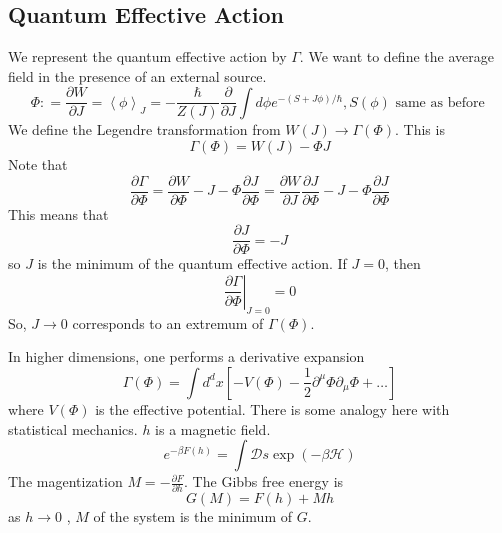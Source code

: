 \documentclass[11pt, oneside]{article}   	%
\theoremstyle{slanted}
\begin{document}
\subsection{Quantum Effective Action}
We represent the quantum effective action by $ \Gamma $. 
We want to define the 
average field in the 
presence of an external source. 
\[
\Phi  : = \frac{\partial  W }{\partial  J } =  \left< \phi  \right> _ J 	=  - \frac{ \hbar }{ Z \left( J  \right) }
\frac{\partial  }{\partial  J } \int d \phi e ^{  - \left(  S + J \phi  \right)   / \hbar } , S \left( 
\phi \right)  \text{ same as before }
\] We define the Legendre transformation from $ W \left( J  \right)  
\to \Gamma \left( \Phi  \right)  $.
This is 
\[
\Gamma ( \Phi ) = W \left(  J  \right)   - \Phi J 
\]  Note that 
\[
\frac{\partial  \Gamma }{\partial  \Phi }   = 
\frac{\partial  W }{\partial  \Phi }   - J -  \Phi \frac{\partial  J }{\partial  
\Phi }   = \frac{\partial W }{\partial  J }  \frac{\partial  J }{\partial  \Phi }  
- J  -\Phi \frac{\partial  J }{\partial  \Phi } 
\] This means 
that 
\[
\frac{\partial  J }{\partial  \Phi }   = - J 
\] so $ J $ is the minimum of the quantum effective 
action. If $ J  = 0 $, then 
\[
\left. \frac{\partial  \Gamma }{\partial  \Phi }  \right\vert_{ J  =0 }  = 0
\] So, $ J \to  0 $ corresponds to an 
extremum of $ \Gamma \left(  \Phi  \right)  $. 

In higher dimensions, 
one performs a derivative expansion 
\[
\Gamma \left( \Phi   \right)   = 
\int d ^ d x \left[   -V \left( \Phi  \right)  
- \frac{1}{2 } \partial  ^ \mu \Phi \partial  _ \mu \Phi + \dots \right] 
\] where $ V \left( \Phi  \right)  $ is the effective potential. 
There is some analogy 
here with statistical mechanics. $ h $ is a magnetic field. 
\[
e ^{  - \beta F (h  ) }  = \int \mathcal{ D } s \exp 
( - \beta \mathcal{ H } )
\] The magentization 
$ M  = - \frac{\partial  F }{\partial  h }  $. The Gibbs free energy 
is \[
G ( M  )  = F \left( h  \right)  + M h 
\] as $ h \to 0 $ , $ M $ of the system is the 
minimum of $ G $. 
\end{document}
